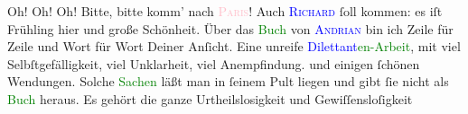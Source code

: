                Oh! Oh! Oh!\pend
           \pstart
           {\pb}Bitte, bitte komm’ nach \textsc{\textcolor{pink}{Paris}{}\ledrightnote{\textcolor{pink}{Paris}}}!\pend
           \pstart
           Auch \textsc{\textcolor{blue}{Richard}{}\ledrightnote{\textcolor{blue}{Richard Beer-Hofmann}}} ſoll kommen: es iſt Frühling hier und große Schönheit.\pend
           \pstart
           Über das \textcolor{green}{Buch}{} von \textsc{\textcolor{blue}{Andrian}{}\ledrightnote{\textcolor{blue}{Leopold von Andrian-Werburg}}} bin ich Zeile für Zeile und Wort für Wort Deiner Anſicht. Eine unreife \textcolor{green}{\textcolor{blue}{Dilettant}{}en-Arbeit}{},
               mit viel Selbſtgefälligkeit, viel Unklarheit, viel Anempfindung. \introOben{}und einigen ſchönen Wendungen.\introOben{} Solche \textcolor{green}{Sachen}{} läßt man in ſeinem Pult liegen und gibt ſie nicht als
                  \textcolor{green}{Buch}{} heraus. Es gehört die
               ganze Urtheilslosigkeit und {\pb}Gewiſſensloſigkeit
